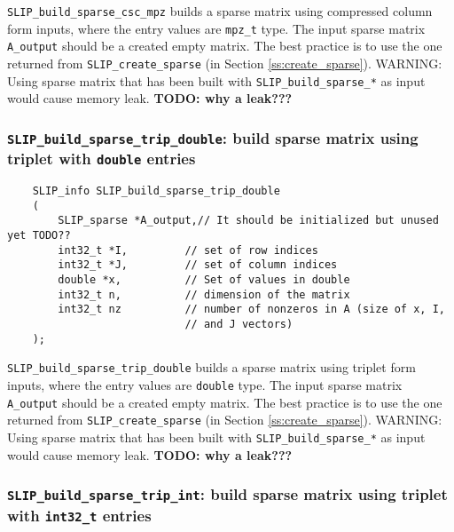 \documentclass[12pt]{article}
\theoremstyle{definition}
\begin{document}
\verb|SLIP_build_sparse_csc_mpz| builds a sparse matrix using compressed column
form inputs, where the entry values are \verb|mpz_t| type. The input sparse
matrix \verb|A_output| should be a created empty matrix. The best practice is
to use the one returned from \verb|SLIP_create_sparse| (in Section
\ref{ss:create_sparse}). WARNING: Using sparse matrix that has been built with
\verb|SLIP_build_sparse_*| as input would cause memory leak.
{\bf TODO: why a leak???} %

\cprotect\subsubsection{\verb|SLIP_build_sparse_trip_double|: build sparse matrix using triplet with \verb|double| entries}
\label{s:user:build_sparse_trip_double}

\begin{mdframed}[userdefinedwidth=6in]
{\footnotesize
\begin{verbatim}
    SLIP_info SLIP_build_sparse_trip_double
    (
        SLIP_sparse *A_output,// It should be initialized but unused yet TODO??
        int32_t *I,         // set of row indices
        int32_t *J,         // set of column indices
        double *x,          // Set of values in double
        int32_t n,          // dimension of the matrix
        int32_t nz          // number of nonzeros in A (size of x, I,
                            // and J vectors)
    );
\end{verbatim}
} \end{mdframed}

\verb|SLIP_build_sparse_trip_double| builds a sparse matrix using triplet form
inputs, where the entry values are \verb|double| type. The input sparse matrix
\verb|A_output| should be a created empty matrix. The best practice is to use
the one returned from \verb|SLIP_create_sparse| (in Section
\ref{ss:create_sparse}). WARNING: Using sparse matrix that has been built with
\verb|SLIP_build_sparse_*| as input would cause memory leak.
{\bf TODO: why a leak???} %

\cprotect\subsubsection{\verb|SLIP_build_sparse_trip_int|: build sparse matrix using triplet with \verb|int32_t| entries}
\label{s:user:build_sparse_trip_int}
\end{document}

